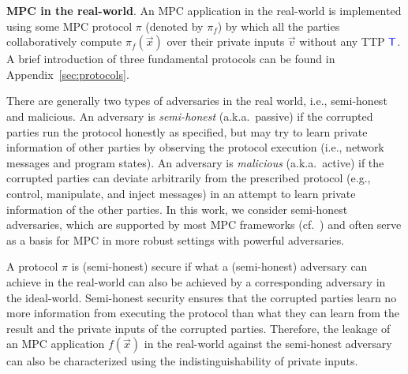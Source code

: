 \smallskip
\noindent
{\bf MPC in the real-world}.
An MPC application in the real-world is implemented using some MPC protocol $\pi$ (denoted by $\pi_f$)
by which all the parties collaboratively compute $\pi_f(\vec{x})$ over their private inputs
$\vec{v}$ without any TTP ${\textcolor{blue}{\sf T}}$. %
A brief introduction of three fundamental protocols can be found in  Appendix~\ref{sec:protocols}.

There are generally two types of adversaries in the real world, i.e., semi-honest and malicious.
An adversary is \emph{semi-honest} (a.k.a.\ passive) if the corrupted parties run the protocol honestly as specified, but may try to learn private information of other parties by observing
the protocol execution (i.e., network messages and program states).
An adversary is \emph{malicious} (a.k.a.\ active) if the corrupted parties
can deviate arbitrarily from the prescribed protocol (e.g., control, manipulate,
and inject messages) in an attempt to learn private information of the other parties.
%
In this work, we consider semi-honest adversaries, which are supported by most MPC frameworks (cf.~\cite{EvansKR18,spdz20})
and %
often serve as a basis for MPC in more robust settings with powerful adversaries.

A protocol $\pi$ is (semi-honest) secure if what a (semi-honest) adversary can achieve in the real-world can also be achieved by a corresponding adversary in the ideal-world.
Semi-honest security ensures that the corrupted parties learn no more information from executing the protocol than what they can learn from the result and the private inputs of the corrupted parties. Therefore,
the leakage of an MPC application $f(\vec{x})$ in the real-world against
the semi-honest adversary can also be characterized using the
indistinguishability of private inputs.


